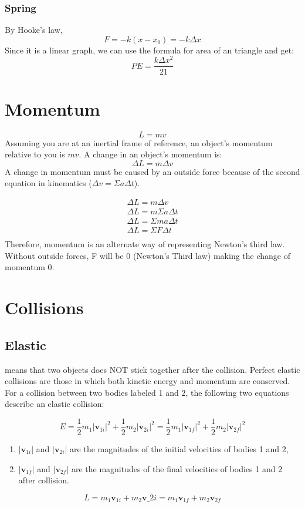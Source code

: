 \documentclass[]{article}
\begin{document}
\subsubsection{Spring}
			By Hooke's law, 
			\[F = -k (x-x_0) = -k\Delta x\]
			Since it is a linear graph, we can use the formula for area of an triangle and get:
				\[PE = \frac{k\Delta x^2}{21}\]

		
\section{Momentum}\label{sec:momentum}
\[L = mv\]
Assuming you are at an inertial frame of reference, an object's momentum relative to you is $mv$.
A change in an object's momentum is:
\[\Delta L = m \Delta v\]
A change in momentum must be caused by an outside force because of the second equation in kinematics ($\Delta v = \Sigma a\Delta t$).

\begin{gather*}
    \Delta L = m\Delta v\\
    \Delta L = m\Sigma a \Delta t\\
    \Delta L = \Sigma m a \Delta t\\
    \Delta L = \Sigma F \Delta t\\
\end{gather*}
Therefore, momentum is an alternate way of representing Newton's third law.
Without outside forces, F will be $0$ (Newton's Third law) making the change of momentum $0$.
 

\section{Collisions}\label{sec:collisions}

\subsection{Elastic}\label{subsec:elastic}
means that two objects does NOT stick together after the collision.
Perfect elastic collisions are those in which both kinetic energy and momentum are conserved.
For a collision between two bodies labeled 1 and 2, the following two equations describe an elastic collision:

\[E = \frac{1}{2} m_1 |\mathbf{v}_{1i}|^2 + \frac{1}{2} m_2 |\mathbf{v}_{2i}|^2 = \frac{1}{2} m_1 |\mathbf{v}_{1f}|^2 + \frac{1}{2} m_2 |\mathbf{v}_{2f}|^2\]

\begin{enumerate}
	\item $|\mathbf{v}_{1i}|$ and $|\mathbf{v}_{2i}|$ are the magnitudes of the initial velocities of bodies 1 and 2,

	\item $|\mathbf{v}_{1f}|$ and $|\mathbf{v}_{2f}|$ are the magnitudes of the final velocities of bodies 1 and 2 after collision.

\end{enumerate}
\[L = m_1 \mathbf{v}_{1i} + m_2 \mathbf{v}\_{2i} = m_1 \mathbf{v}_{1f} + m_2 \mathbf{v}_{2f}\]
\end{document}
